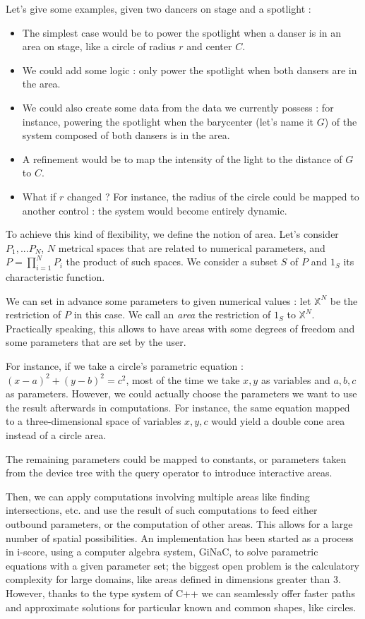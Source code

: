 \documentclass{sigchi}
\begin{document}
Let's give some examples, given two dancers on stage and a spotlight : 
\begin{itemize}
	\item The simplest case would be to power the spotlight when a danser is in an area on stage, like a circle of radius $r$ and center $C$.
	\item We could add some logic : only power the spotlight when both dansers are in the area.
	\item We could also create some data from the data we currently possess : for instance, powering the spotlight when the barycenter (let's name it $G$) of the system composed of both dansers is in the area.
	\item A refinement would be to map the intensity of the light to the distance of $G$ to $C$.
	\item What if $r$ changed ? For instance, the radius of the circle could be mapped to another control : the system would become entirely dynamic.
\end{itemize}

To achieve this kind of flexibility, we define the notion of area. Let's consider $P_1, ... P_N$, $N$ metrical spaces that are related to numerical parameters, and $P = \prod\limits^N_{i=1}P_i$ the product of such spaces. We consider a subset $S$ of $P$ and $1_S$ its characteristic function. 

We can set in advance some parameters to given numerical values : let $\mathbb{X}^N$ be the restriction of $P$ in this case. We call an \textit{area} the restriction of $1_S$ to $\mathbb{X}^N$. Practically speaking, this allows to have areas with some degrees of freedom and some parameters that are set by the user.

For instance, if we take a circle's parametric equation : $(x - a)^2 + (y - b)^2 = c^2$, most of the time we take $x, y$ as variables and $a, b, c$ as parameters. However, we could actually choose the parameters we want to use the result afterwards in computations. For instance, the same equation mapped to a three-dimensional space of variables $x, y, c$ would yield a double cone area instead of a circle area.

The remaining parameters could be mapped to constants, or parameters taken from the device tree with the query operator to introduce interactive areas.

Then, we can apply computations involving multiple areas like finding intersections, etc. and use the result of such computations to feed either outbound parameters, or the computation of other areas. This allows for a large number of spatial possibilities. An implementation has been started as a process in i-score, using a computer algebra system, GiNaC\cite{bauer2002introduction}, to solve parametric equations with a given parameter set; the biggest open problem is the calculatory complexity for large domains, like areas defined in dimensions greater than 3. However, thanks to the type system of C++ we can seamlessly offer faster paths and approximate solutions for particular known and common shapes, like circles.
\end{document}
